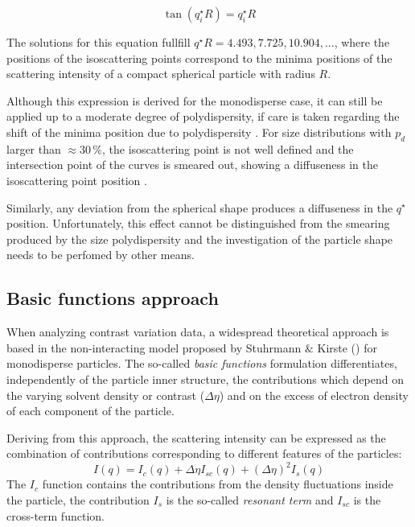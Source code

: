 \begin{equation}
        \label{eq:isoscattering}
        \tan(q^{\star}_iR)=q^{\star}_iR
\end{equation}

The solutions for this equation fullfill $q^{\star} R =4.493, 7.725, 10.904, ...$, where the positions of the isoscattering points correspond to the minima positions of the scattering intensity of a compact spherical particle with radius \( R \). 

Although this expression is derived for the monodisperse case, it can still be applied up to a moderate degree of polydispersity, if care is taken regarding the shift of the minima position due to polydispersity \citep{beurten_polydispersity_1981}. For size distributions with \( p_d\) larger than \( \approx 30\,\% \), the isoscattering point is not well defined and the intersection point of the curves is smeared out, showing a diffuseness in the isoscattering point position \citep{kawaguchi_isoscattering_1992}.

Similarly, any deviation from the spherical shape produces a diffuseness in the $q^{\star}$ position. Unfortunately, this effect cannot be distinguished from the smearing produced by the size polydispersity and the investigation of the particle shape needs to be perfomed by other means.


\subsection{Basic functions approach}
When analyzing contrast variation data, a widespread theoretical approach is based in the non-interacting model proposed by Stuhrmann $\&$ Kirste (\citeyear{stuhrmann_elimination_1965,stuhrmann_elimination_1967}) for monodisperse particles. The so-called \emph{basic functions} formulation differentiates, independently of the particle inner structure, the contributions which depend on the varying solvent density or contrast (\(\Delta\eta\)) and on the excess of electron density of each component of the particle. 

Deriving from this approach, the scattering intensity can be expressed as the combination of contributions corresponding to different features of the particles:
\begin{equation}
\label{eq:intensity_contrast}
I(q)=I_c(q)+\Delta\eta I_{sc}(q)+(\Delta\eta)^2 I_{s}(q)
\end{equation}
The $I_c$ function contains the contributions from the density fluctuations inside the particle, the contribution $I_s$ is the so-called \emph{resonant term} and $I_{sc}$ is the cross-term function.


